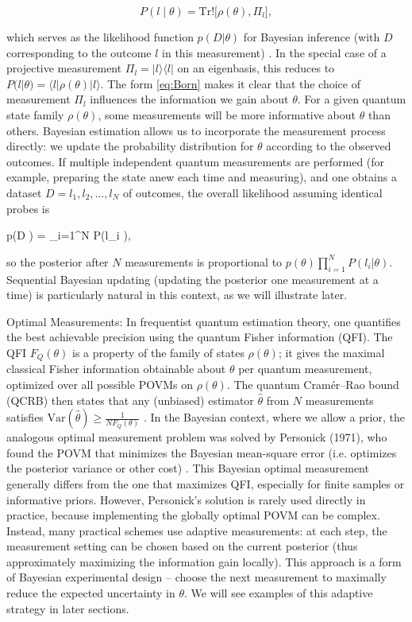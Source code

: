 \begin{equation}

P(l \mid \theta) = \mathrm{Tr}!\big[\rho(\theta), \Pi_l\big],

\label{eq:Born}

\end{equation}

which serves as the likelihood function $p(D|\theta)$ for Bayesian inference (with $D$ corresponding to the outcome $l$ in this measurement) . In the special case of a projective measurement ${\Pi_l = |l\rangle\langle l|}$ on an eigenbasis, this reduces to $P(l|\theta) = \langle l|\rho(\theta)|l\rangle$. The form \eqref{eq:Born} makes it clear that the choice of measurement ${\Pi_l}$ influences the information we gain about $\theta$. For a given quantum state family $\rho(\theta)$, some measurements will be more informative about $\theta$ than others. Bayesian estimation allows us to incorporate the measurement process directly: we update the probability distribution for $\theta$ according to the observed outcomes. If multiple independent quantum measurements are performed (for example, preparing the state anew each time and measuring), and one obtains a dataset $D = {l_1, l_2, \dots, l_N}$ of outcomes, the overall likelihood assuming identical probes is

p(D \mid \theta) = \prod_{i=1}^N P(l_i \mid \theta),

so the posterior after $N$ measurements is proportional to $p(\theta) \prod_{i=1}^N P(l_i|\theta)$. Sequential Bayesian updating (updating the posterior one measurement at a time) is particularly natural in this context, as we will illustrate later.



Optimal Measurements: In frequentist quantum estimation theory, one
quantifies the best achievable precision using the quantum Fisher
information (QFI). The QFI $F_Q(\theta)$ is a property of the family
of states $\rho(\theta)$; it gives the maximal classical Fisher
information obtainable about $\theta$ per quantum measurement,
optimized over all possible POVMs on $\rho(\theta)$. The quantum
Cramér–Rao bound (QCRB) then states that any (unbiased) estimator
$\hat{\theta}$ from $N$ measurements satisfies
$\mathrm{Var}(\hat{\theta}) \ge \frac{1}{N F_Q(\theta)}$ . In the
Bayesian context, where we allow a prior, the analogous optimal
measurement problem was solved by Personick (1971), who found the POVM
that minimizes the Bayesian mean-square error (i.e. optimizes the
posterior variance or other cost) . This Bayesian optimal measurement
generally differs from the one that maximizes QFI, especially for
finite samples or informative priors. However, Personick’s solution is
rarely used directly in practice, because implementing the globally
optimal POVM can be complex. Instead, many practical schemes use
adaptive measurements: at each step, the measurement setting can be
chosen based on the current posterior (thus approximately maximizing
the information gain locally). This approach is a form of Bayesian
experimental design – choose the next measurement to maximally reduce
the expected uncertainty in $\theta$. We will see examples of this
adaptive strategy in later sections.



